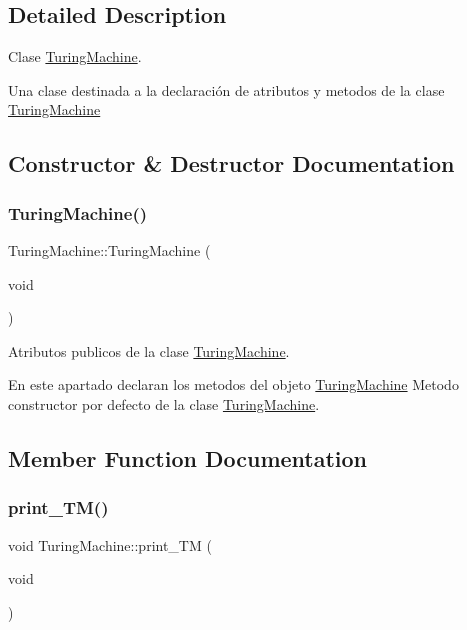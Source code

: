 \subsection{Detailed Description}
Clase \hyperlink{class_turing_machine}{Turing\+Machine}. 

Una clase destinada a la declaración de atributos y metodos de la clase \hyperlink{class_turing_machine}{Turing\+Machine} 

\subsection{Constructor \& Destructor Documentation}
\hypertarget{class_turing_machine_a4b0fcfdedb6af49b88bd7a43ca17c530}{}\label{class_turing_machine_a4b0fcfdedb6af49b88bd7a43ca17c530} 
\subsubsection{\texorpdfstring{Turing\+Machine()}{TuringMachine()}}
{\footnotesize\ttfamily Turing\+Machine\+::\+Turing\+Machine (\begin{DoxyParamCaption}\item[{void}]{ }\end{DoxyParamCaption})}



Atributos publicos de la clase \hyperlink{class_turing_machine}{Turing\+Machine}. 

En este apartado declaran los metodos del objeto \hyperlink{class_turing_machine}{Turing\+Machine} Metodo constructor por defecto de la clase \hyperlink{class_turing_machine}{Turing\+Machine}. 

\subsection{Member Function Documentation}
\hypertarget{class_turing_machine_a3ef5de7d4213694b979969af00e12463}{}\label{class_turing_machine_a3ef5de7d4213694b979969af00e12463} 
\subsubsection{\texorpdfstring{print\+\_\+\+T\+M()}{print\_TM()}}
{\footnotesize\ttfamily void Turing\+Machine\+::print\+\_\+\+TM (\begin{DoxyParamCaption}\item[{void}]{ }\end{DoxyParamCaption})}



